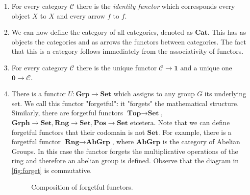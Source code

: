 \documentclass[11pt]{article}
\theoremstyle{plain}
\theoremstyle{definition}
\theoremstyle{remark}
\newcommand{\cC}{\mathcal{C}}
\begin{document}
\begin{examples}\label{examples:functors}
\begin{enumerate}
   \item For every category $\cC$ there is the {\em identity functor} which
   corresponds every object $X$ to $X$ and every arrow $f$ to $f$.
   
   \item We can now define the category of all categories, denoted as
   $\textbf{Cat}$. This has as objects the categories and as
   arrows the functors between categories.
   The fact that this is a category follows immediately 
   from the associativity of functors.
   
   \item For every category $\cC$ there is the unique functor $\cC
   \rightarrow \mathbf{1}$ and a unique one $\textbf{0} \rightarrow \cC$.
   
   \item There is a functor $U: \textbf{Grp} \rightarrow \textbf{Set}$ which
   assigns to any group $G$ its underlying set. We call this functor
   "forgetful": it "forgets" the mathematical structure. Similarly, there
   are
   forgetful functors $\textbf{Top} \rightarrow \textbf{Set}$,
   $\textbf{Grph}
   \rightarrow \textbf{Set} , \textbf{Rng} \rightarrow \textbf{Set},
    \textbf{Pos} \rightarrow \textbf{Set}$ etcetera.
    Note that we can define forgetful functors that their codomain is not 
    $\textbf{Set.}$
    For example, there is a forgetful functor
    $\textbf{Rng}\rightarrow
    \textbf{AbGrp}$, where $\textbf{AbGrp}$ is the category of Abelian
    Groups. In this case the functor forgets the multiplicative operations
    of
    the ring and therefore an abelian group is defined. Observe that the
    diagram in \autoref{fig:forget} is commutative.
    \begin{figure}[h]
    \centering
    \caption{Composition of forgetful functors.}
    \label{fig:forget}
    \end{figure}


\end{enumerate}
\end{examples}
\end{document}
